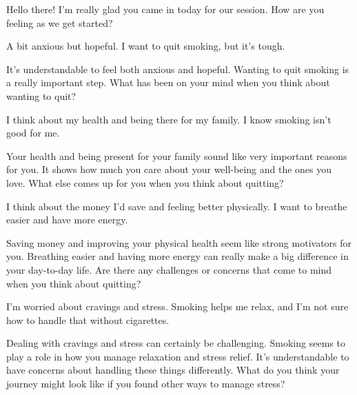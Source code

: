 \begin{counsellorbox}
	Hello there! I'm really glad you came in today for our session. How are you feeling as we get started?
\end{counsellorbox}

\begin{clientbox}
	A bit anxious but hopeful. I want to quit smoking, but it's tough.
\end{clientbox}

\begin{counsellorbox}
	It’s understandable to feel both anxious and hopeful. Wanting to quit smoking is a really important step. What has been on your mind when you think about wanting to quit?
\end{counsellorbox}

\begin{clientbox}
	I think about my health and being there for my family. I know smoking isn't good for me.
\end{clientbox}

\begin{counsellorbox}
	Your health and being present for your family sound like very important reasons for you. It shows how much you care about your well-being and the ones you love. What else comes up for you when you think about quitting?
\end{counsellorbox}

\begin{clientbox}
	I think about the money I'd save and feeling better physically. I want to breathe easier and have more energy.
\end{clientbox}

\begin{counsellorbox}
	Saving money and improving your physical health seem like strong motivators for you. Breathing easier and having more energy can really make a big difference in your day-to-day life. Are there any challenges or concerns that come to mind when you think about quitting?
\end{counsellorbox}

\begin{clientbox}
	I'm worried about cravings and stress. Smoking helps me relax, and I'm not sure how to handle that without cigarettes.
\end{clientbox}

\begin{counsellorbox}
	Dealing with cravings and stress can certainly be challenging. Smoking seems to play a role in how you manage relaxation and stress relief. It's understandable to have concerns about handling these things differently. What do you think your journey might look like if you found other ways to manage stress?
\end{counsellorbox}

